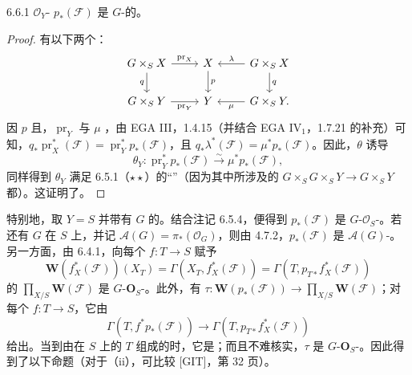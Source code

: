\begin{SGAresult}{}{6.6.1}
 $\mathcal O_Y$- $p_*(\mathcal F)$ 是 $G$-的。
\end{SGAresult}
\begin{proof}
有以下两个：
\[
\begin{tikzcd}
G\times_S X\arrow[r,"{\operatorname{pr}_X}"]\arrow[d,"{q}"']&X\arrow[d,"{p}"]&G\times_S X\arrow[l,"{\lambda}"']\arrow[d,"{q}"]\\
G\times_S Y\arrow[r,"{\operatorname{pr}_Y}"']&Y&G\times_S Y\arrow[l,"{\mu}"].
\end{tikzcd}
\]
因 $p$ 且，$\operatorname{pr}_Y$ 与 $\mu$ ，由 EGA III，1.4.15（并结合 EGA $\mathrm{IV}_1$，1.7.21 的补充）可知，$q_*\operatorname{pr}_X^*(\mathcal F)=\operatorname{pr}_Y^*p_*(\mathcal F)$，且 $q_*\lambda^*(\mathcal F)=\mu^*p_*(\mathcal F)$。因此，$\theta$ 诱导
\[
\theta_Y:\operatorname{pr}_Y^*p_*(\mathcal F)\xrightarrow\sim\mu^*p_*(\mathcal F),
\]
同样得到 $\theta_Y$ 满足 6.5.1（$\star\star$）的“”（因为其中所涉及的 $G\times_S G\times_S Y\to G\times_S Y$ 都）。这证明了。
\end{proof}
特别地，取 $Y=S$ 并带有 $G$ 的。结合注记 6.5.4，便得到 $p_*(\mathcal F)$ 是 $G$-$\mathcal O_S$-。若还有 $G$ 在 $S$ 上，并记 $\mathcal A(G)=\pi_*(\mathcal O_G)$，则由 4.7.2，$p_*(\mathcal F)$ 是 $\mathcal A(G)$-。
另一方面，由 6.4.1，向每个 $f:T\to S$ 赋予
\[
\mathbf W(f_X^*(\mathcal F))(X_T)=\Gamma(X_T,f_X^*(\mathcal F))=\Gamma(T,p_{T*}f_X^*(\mathcal F))
\]
的 $\prod_{X/S}\mathbf W(\mathcal F)$ 是 $G$-$\mathbf O_S$-。此外，有 $\tau:\mathbf W(p_*(\mathcal F))\to\prod_{X/S}\mathbf W(\mathcal F)$；对每个 $f:T\to S$，它由
\[
\Gamma(T,f^*p_*(\mathcal F))\longrightarrow\Gamma(T,p_{T*}f_X^*(\mathcal F))
\]
给出。当到由在 $S$ 上的 $T$ 组成的时，它是；而且不难核实，$\tau$ 是 $G$-$\mathbf O_S$-。因此得到了以下命题（对于（ii），可比较 [GIT]，第 32 页）。
